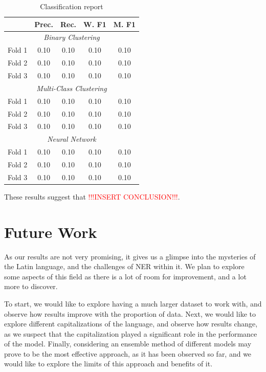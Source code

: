\documentclass[11pt]{article}
\begin{document}
\begin{table}[H]
  \centering
  \begin{tabular}{|l|c|c|c|c|}
  \hline
  \textbf{} & \textbf{Prec.} & \textbf{Rec.} & \textbf{W. F1} & \textbf{M. F1} \\
  \hline
  \multicolumn{5}{|c|}{\textit{Binary Clustering}} \\
  \hline
  Fold 1   & 0.10 & 0.10 & 0.10 & 0.10 \\
  Fold 2   & 0.10 & 0.10 & 0.10 & 0.10 \\
  Fold 3   & 0.10 & 0.10 & 0.10 & 0.10 \\
  \hline
  \multicolumn{5}{|c|}{\textit{Multi-Class Clustering}} \\
  \hline
  Fold 1   & 0.10 & 0.10 & 0.10 & 0.10 \\
  Fold 2   & 0.10 & 0.10 & 0.10 & 0.10 \\
  Fold 3   & 0.10 & 0.10 & 0.10 & 0.10 \\
  \hline
  \multicolumn{5}{|c|}{\textit{Neural Network}} \\
  \hline
  Fold 1   & 0.10 & 0.10 & 0.10 & 0.10 \\
  Fold 2   & 0.10 & 0.10 & 0.10 & 0.10 \\
  Fold 3   & 0.10 & 0.10 & 0.10 & 0.10 \\
  \hline
  \end{tabular}
  \caption{Classification report}
  \label{tab:Classification-Report}
\end{table}

These results suggest that \textcolor{red}{!!!INSERT CONCLUSION!!!}.

\section{Future Work}

As our results are not very promising, it gives us a glimpse into the mysteries of the Latin language, and the challenges of NER within it.
We plan to explore some aspects of this field as there is a lot of room for improvement, and a lot more to discover.

To start, we would like to explore having a much larger dataset to work with, and observe how results improve with the proportion of data.
Next, we would like to explore different capitalizations of the language, and observe how results change, as we
suspect that the capitalization played a significant role in the performance of the model.
Finally, considering an ensemble method of different models may prove to be the most effective approach, as it has been observed so far,
and we would like to explore the limits of this approach and benefits of it.
\end{document}
